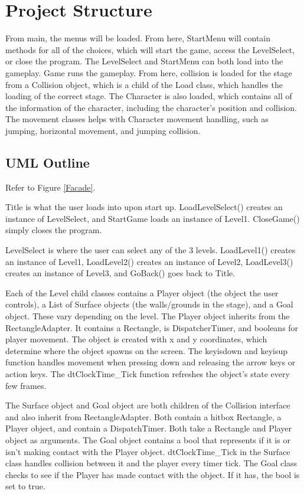 \documentclass[10pt,conference,onecolumn,compsoc]{IEEEtran}
\begin{document}
\section{Project Structure}
From main, the menus will be loaded. From here, StartMenu will contain methods for all of the choices, which will start the game, access the LevelSelect, or close the program. The LevelSelect and StartMenu can both load into the gameplay. Game runs the gameplay. From here, collision is loaded for the stage from a Collision object, which is a child of the Load class, which handles the loading of the correct stage. The Character is also loaded, which contains all of the information of the character, including the character’s position and collision. The movement classes helps with Character movement handling, such as jumping, horizontal movement, and jumping collision.

\subsection{UML Outline}
Refer to Figure \ref{Facade}.

Title is what the user loads into upon start up. LoadLevelSelect() creates an instance of LevelSelect, and StartGame loads an instance of Level1. CloseGame() simply closes the program.

LevelSelect is where the user can select any of the 3 levels. LoadLevel1() creates an instance of Level1, LoadLevel2() creates an instance of Level2, LoadLevel3() creates an instance of Level3, and GoBack() goes back to Title.

Each of the Level child classes contains a Player object (the object the user controls), a List of Surface objects (the walls/grounds in the stage), and a Goal object. These vary depending on the level.
The Player object inherits from the RectangleAdapter. It contains a Rectangle, is DispatcherTimer, and booleans for player movement. The object is created with x and y coordinates, which determine where the object spawns on the screen. The keyisdown and keyisup function handles movement when pressing down and releasing the arrow keys or action keys. The dtClockTime\_Tick function refreshes the object's state every few frames.

The Surface object and Goal object are both children of the Collision interface and also inherit from RectangleAdapter. Both contain a hitbox Rectangle, a Player object, and contain a DispatchTimer. Both take a Rectangle and Player object as arguments. The Goal object contains a bool that represents if it is or isn't making contact with the Player object. dtClockTime\_Tick in the Surface class handles collision between it and the player every timer tick. The Goal class checks to see if the Player has made contact with the object. If it has, the bool is set to true.
\end{document}
